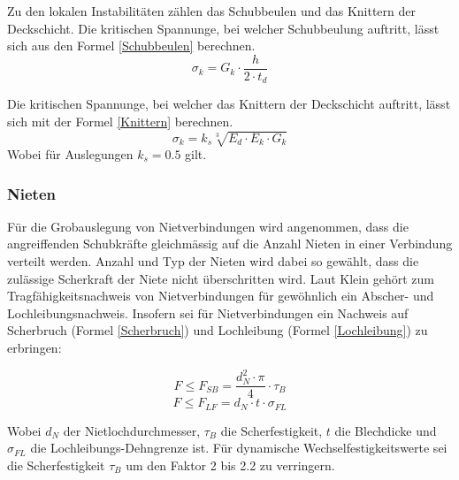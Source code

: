     Zu den lokalen Instabilitäten zählen das Schubbeulen und das Knittern der Deckschicht. Die kritischen Spannunge, bei welcher Schubbeulung auftritt, lässt sich aus den Formel \ref{Schubbeulen} berechnen. \cite{ETH}
    \begin{equation}
      \label{Schubbeulen}
      \sigma_k = G_k \cdot \frac{h}{2 \cdot t_d}
    \end{equation}

    Die kritischen Spannunge, bei welcher das Knittern der Deckschicht auftritt, lässt sich mit der Formel \ref{Knittern} berechnen. \cite{ETH}
    \begin{equation}
      \label{Knittern}
      \sigma_k = k_s\sqrt[3]{E_d \cdot E_k \cdot G_k}
    \end{equation}
    Wobei für Auslegungen \(k_s = 0.5\) gilt.


  \subsubsection{Nieten}
    Für die Grobauslegung von Nietverbindungen wird angenommen, dass die angreiffenden Schubkräfte gleichmässig auf die Anzahl Nieten in einer Verbindung verteilt werden. Anzahl und Typ der Nieten wird dabei so gewählt, dass die zulässige Scherkraft der Niete nicht überschritten wird. Laut Klein \cite{klein} gehört zum Tragfähigkeitsnachweis von Nietverbindungen für gewöhnlich ein Abscher- und Lochleibungsnachweis. Insofern sei für Nietverbindungen ein Nachweis auf Scherbruch (Formel \ref{Scherbruch}) und Lochleibung (Formel \ref{Lochleibung}) zu erbringen:
    \begin{multicols}{2}
      \begin{equation}
        \label{Scherbruch}
        F \leq F_{SB} = \frac{d_N^2 \cdot \pi}{4}\cdot \tau_B
      \end{equation}\break
      \begin{equation}
        \label{Lochleibung}
        F \leq F_{LF} = d_N \cdot t \cdot \sigma_{FL}
      \end{equation}
    \end{multicols}
    Wobei $d_N$ der Nietlochdurchmesser, $\tau_B$ die Scherfestigkeit, $t$ die Blechdicke und $\sigma_{FL}$ die Lochleibungs-Dehngrenze ist. Für dynamische Wechselfestigkeitswerte sei die Scherfestigkeit $\tau_B$ um den Faktor 2 bis 2.2 zu verringern.

